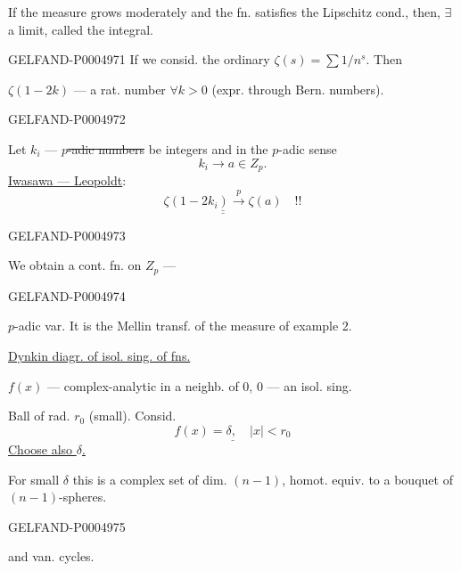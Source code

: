 If the measure grows moderately and the fn. satisfies the Lipschitz cond., then, $\exists$ a limit, called the integral.


\begin{GelfandAdjacentEvidence}{GELFAND-P000497}{1}
If we consid. the ordinary $\zeta(s)=\sum 1/n^s$. Then

$\zeta(1-2k)$ — a rat. number $\forall k>0$ (expr. through Bern. numbers).

\end{GelfandAdjacentEvidence}
\begin{GelfandAdjacentEvidence}{GELFAND-P000497}{2}

Let $k_i$ — \sout{\mbox{$p$}-adic numbers} be integers and in the \mbox{$p$}-adic sense
\[
k_i\longrightarrow a\in Z_p.
\]
\uline{Iwasawa — Leopoldt}:
\[
\underline{\underline{\zeta(1-2k_i)\overset{p}{\longrightarrow}\zeta(a)}}\quad!!
\]
\end{GelfandAdjacentEvidence}
\begin{GelfandAdjacentEvidence}{GELFAND-P000497}{3}


We obtain a cont. fn. on $Z_p$ —
\end{GelfandAdjacentEvidence}
\begin{GelfandAdjacentEvidence}{GELFAND-P000497}{4}

$p$-adic var. It is the Mellin transf. of the measure of example 2.

 \uline{Dynkin diagr. of isol. sing. of fns.}

$f(x)$ — complex-analytic in a neighb. of $0$, $0$ — an isol. sing.

Ball of rad. $r_0$ (small). Consid.
\[
\underline{f(x)=\delta,\quad |x|<r_0}
\]
\uline{Choose also \mbox{$\delta$}.}

For small $\delta$ this is a complex set of dim. $(n-1)$, homot. equiv. to a bouquet of $(n-1)$-spheres.
\end{GelfandAdjacentEvidence}
\begin{GelfandAdjacentEvidence}{GELFAND-P000497}{5}


and van. cycles.
\end{GelfandAdjacentEvidence}



